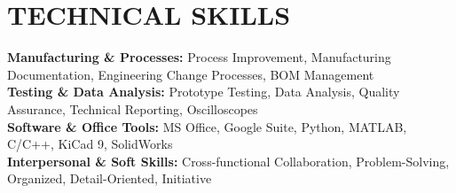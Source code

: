 \documentclass[letterpaper,11pt]{article}
\begin{document}
\section{TECHNICAL SKILLS}
 \begin{itemize}[leftmargin=0.15in, label={}]
    \small{\item{
     \textbf{Manufacturing \& Processes:} Process Improvement, Manufacturing Documentation, Engineering Change Processes, BOM Management \\
     \textbf{Testing \& Data Analysis:} Prototype Testing, Data Analysis, Quality Assurance, Technical Reporting, Oscilloscopes \\
     \textbf{Software \& Office Tools:} MS Office, Google Suite, Python, MATLAB, C/C++, KiCad 9, SolidWorks \\
     \textbf{Interpersonal \& Soft Skills:} Cross-functional Collaboration, Problem-Solving, Organized, Detail-Oriented, Initiative
    }}
 \end{itemize}


\end{document}
